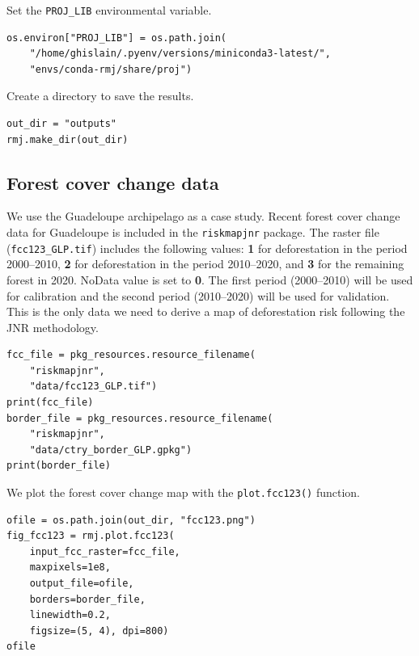 \documentclass[paper=a4, 12pt, DIV=12]{scrartcl}
\begin{document}
Set the \texttt{PROJ\_LIB} environmental variable.

\begin{verbatim}
os.environ["PROJ_LIB"] = os.path.join(
    "/home/ghislain/.pyenv/versions/miniconda3-latest/",
    "envs/conda-rmj/share/proj")
\end{verbatim}

Create a directory to save the results.

\begin{verbatim}
out_dir = "outputs"
rmj.make_dir(out_dir)
\end{verbatim}

\subsection{Forest cover change data}
\label{sec:org0c454ec}

We use the Guadeloupe archipelago as a case study. Recent forest cover change data for Guadeloupe is included in the \texttt{riskmapjnr} package. The raster file (\texttt{fcc123\_GLP.tif}) includes the following values: \textbf{1} for deforestation in the period 2000--2010, \textbf{2} for deforestation in the period 2010--2020, and \textbf{3} for the remaining forest in 2020. NoData value is set to \textbf{0}. The first period (2000--2010) will be used for calibration and the second period (2010--2020) will be used for validation. This is the only data we need to derive a map of deforestation risk following the JNR methodology.

\begin{verbatim}
fcc_file = pkg_resources.resource_filename(
    "riskmapjnr",
    "data/fcc123_GLP.tif")
print(fcc_file)
border_file = pkg_resources.resource_filename(
    "riskmapjnr",
    "data/ctry_border_GLP.gpkg")
print(border_file)
\end{verbatim}

We plot the forest cover change map with the \texttt{plot.fcc123()} function.

\begin{verbatim}
ofile = os.path.join(out_dir, "fcc123.png")
fig_fcc123 = rmj.plot.fcc123(
    input_fcc_raster=fcc_file,
    maxpixels=1e8,
    output_file=ofile,
    borders=border_file,
    linewidth=0.2,
    figsize=(5, 4), dpi=800)
ofile
\end{verbatim}
\end{document}
